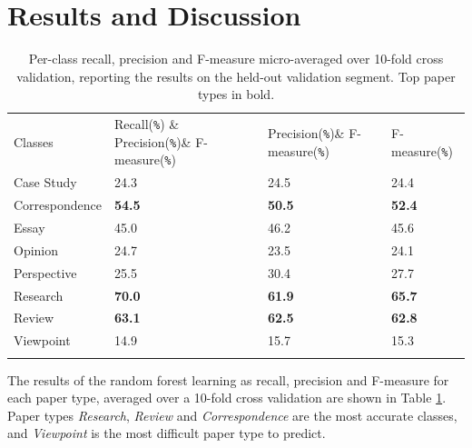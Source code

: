 \documentclass{svmult}
\begin{document}
\section{Results and Discussion}
\label{sec:3}


\begin{table}

\caption{Per-class recall, precision and F-measure micro-averaged over 10-fold cross validation, reporting the results on the held-out validation segment. Top paper types in bold.}

\begin{tabular}{p{2.4cm}p{2.0cm}p{2.0cm}p{2.5cm}}
\hline\noalign{\smallskip}
Classes & Recall(\verb|%|) & Precision(\verb|%|)& F-measure(\verb|%|) \\
\noalign{\smallskip}\svhline\noalign{\smallskip}
Case Study      &   24.3    &    24.5     &   24.4 \\
Correspondence  &   {\bf  54.5}    &    {\bf 50.5}    &    {\bf 52.4} \\ 
Essay           &   45.0     &   46.2    &    45.6 \\
Opinion         &   24.7    &    23.5  &      24.1 \\   
Perspective     &   25.5  &      30.4  &       27.7 \\
Research        &   {\bf 70.0}    &    {\bf 61.9}    &    {\bf 65.7} \\
Review          &  {\bf 63.1}     &   {\bf 62.5}     &   {\bf 62.8} \\
Viewpoint       &     14.9     &   15.7  &      15.3 \\
\noalign{\smallskip}\hline\noalign{\smallskip}
\end{tabular}


\label{tab:recallPrecision}       %
\end{table}

The results of the random forest learning as recall, precision and F-measure
for each paper type, averaged over a 10-fold cross validation are shown in Table
\ref{tab:recallPrecision}. Paper types {\em Research}, {\em Review} and {\em
Correspondence} are the most accurate classes, and {\em Viewpoint} is the most
difficult paper type to predict. 
\end{document}

